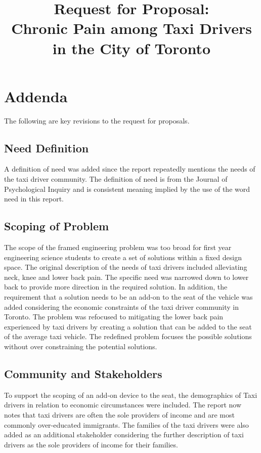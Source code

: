 \documentclass[11pt]{article}
\begin{document}
\title{Request for Proposal: \\Chronic Pain among Taxi Drivers in the
  City of Toronto}
\maketitle
\begin{abstract}

\end{abstract}
\newpage
\tableofcontents
\newpage
\section{Addenda} 
\label{sec:toadd}
The following are key revisions to the request for proposals. 

\subsection{Need Definition}
\label{sec:needdef}
A definition of need was added since the report repeatedly mentions the 
needs of the taxi driver community. The definition of need is from the 
Journal of Psychological Inquiry and is consistent meaning implied by 
the use of the word need in this report. 

\subsection{Scoping of Problem}
\label{sec:scoping}
The scope of the framed engineering problem was too broad for first year 
engineering science students to create a set of solutions within a fixed 
design space. The original description of the needs of taxi drivers included 
alleviating neck, knee and lower back pain. The specific need was narrowed 
down to lower back to provide more direction in the required solution. 
In addition, the requirement that a solution needs to be an add-on to the 
seat of the vehicle was added considering the economic constraints of the 
taxi driver community in Toronto. The problem was refocused to mitigating 
the lower back pain experienced by taxi drivers by creating a solution that 
can be added to the seat of the average taxi vehicle. The redefined problem 
focuses the possible solutions without over constraining the potential solutions. 

\subsection{Community and Stakeholders}
\label{sec:comm and stake}
To support the scoping of an add-on device to the seat, the demographics of 
Taxi drivers in relation to economic circumstances were included.  The report 
now notes that taxi drivers are often the sole providers of income and are most 
commonly over-educated immigrants. The families of the taxi drivers were also added 
as an additional stakeholder considering the further description of taxi drivers as 
the sole providers of income for their families. 
\end{document}
